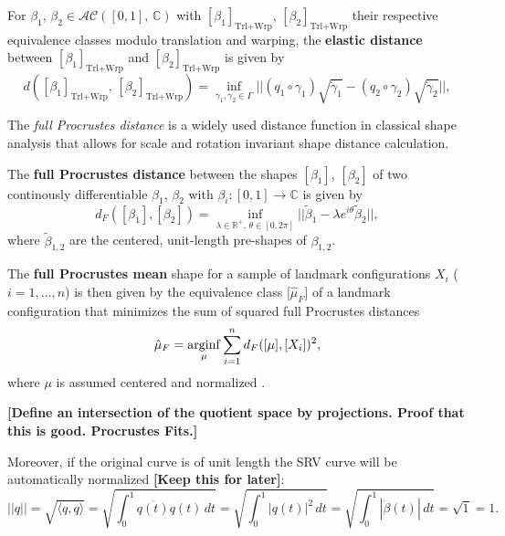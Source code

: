 \begin{definition}
  For $\beta_1$, $\beta_2 \in \mathcal{AC}([0,1],\,\mathbb{C})$ with $[\beta_1]_{\text{Trl+Wrp}}$, $[\beta_2]_{\text{Trl+Wrp}}$ their respective equivalence classes modulo translation and warping, the \textbf{elastic distance} between $[\beta_1]_{\text{Trl+Wrp}}$ and $[\beta_2]_{\text{Trl+Wrp}}$ is given by
  $$d([\beta_1]_{\text{Trl+Wrp}},\, [\beta_2]_{\text{Trl+Wrp}}) = \inf_{\gamma_1, \gamma_2 \in \Gamma} || (q_1 \circ \gamma_1) \sqrt{\dot\gamma_1}- (q_2 \circ \gamma_2) \sqrt{\dot\gamma_2} ||,$$
\end{definition}

The \textit{full Procrustes distance} is a widely used distance function in
classical shape analysis that allows for scale and rotation invariant shape
distance calculation.
\begin{definition}
  The \textbf{full Procrustes distance} between the shapes $[\beta_1]$,
  $[\beta_2]$ of two continously differentiable $\beta_1$, $\beta_2$ with
  $\beta_i : [0,1] \rightarrow \mathbb{C}$ is given by 
    $$d_F([\beta_1], [\beta_2]) = \inf_{\lambda \in \mathbb{R}^+,\, \theta \in
    [0,2\pi]} ||\tilde{\beta}_1 - \lambda e^{i\theta} \tilde{\beta}_2||, $$
    where $\tilde\beta_{1,2}$ are the centered, unit-length pre-shapes of
    $\beta_{1,2}$.
\end{definition}
\begin{definition}
    The \textbf{full Procrustes mean} shape for a sample of landmark
    configurations $X_i$ ($i = 1,\dots,n$) is then given by the equivalence
    class [$\hat\mu_F$] of a landmark configuration that minimizes the sum of
    squared full Procrustes distances
    $$\hat{\mu}_F = \operatorname*{arginf}_{\mu} \sum_{i=1}^n d_F([\mu], [X_i])^2, $$
    where $\mu$ is assumed centered and normalized
    \parencites[see][71,114]{DrydenMardia2016}.
\end{definition}

\textbf{[Define an intersection of the quotient space by projections. Proof that this is good. Procrustes Fits.]}

Moreover, if the original curve is of unit length the SRV curve will be automatically normalized \textbf{[Keep this for later]}:
$$ ||q|| = \sqrt{\langle q, q \rangle} = \sqrt{ \int_0^1 \overline{q(t)} q(t) \, dt } = \sqrt{ \int_0^1 |q(t)|^2 \, dt} = \sqrt{\int_0^1 |\dot{\beta}(t)| \, dt} = \sqrt{1} = 1. $$

